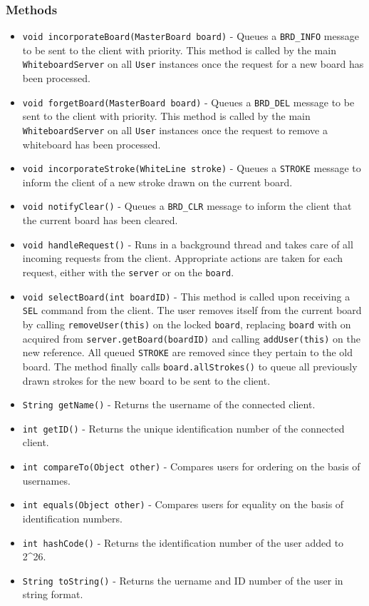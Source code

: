 \subsubsection{Methods}
\begin{itemize}
\item \texttt{void incorporateBoard(MasterBoard board)} - Queues a \texttt{BRD\_INFO} message to be sent to the client with priority. This method is called by the main \texttt{WhiteboardServer} on all \texttt{User} instances once the request for a new board has been processed.
\item \texttt{void forgetBoard(MasterBoard board)} - Queues a \texttt{BRD\_DEL} message to be sent to the client with priority. This method is called by the main \texttt{WhiteboardServer} on all \texttt{User} instances once the request to remove a whiteboard has been processed.
\item \texttt{void incorporateStroke(WhiteLine stroke)} - Queues a \texttt{STROKE} message to inform the client of a new stroke drawn on the current board.
\item \texttt{void notifyClear()} - Queues a \texttt{BRD\_CLR} message to inform the client that the current board has been cleared.
\item \texttt{void handleRequest()} - Runs in a background thread and takes care of all incoming requests from the client. Appropriate actions are taken for each request, either with the \texttt{server} or on the \texttt{board}.
\item \texttt{void selectBoard(int boardID)} - This method is called upon receiving a \texttt{SEL} command from the client. The user removes itself from the current board by calling \texttt{removeUser(this)} on the locked \texttt{board}, replacing \texttt{board} with on acquired from \texttt{server.getBoard(boardID)} and calling \texttt{addUser(this)} on the new reference. All queued \texttt{STROKE} are removed since they pertain to the old board. The method finally calls \texttt{board.allStrokes()} to queue all previously drawn strokes for the new board to be sent to the client.
\item \texttt{String getName()} - Returns the username of the connected client.
\item \texttt{int getID()} - Returns the unique identification number of the connected client.
\item \texttt{int compareTo(Object other)} - Compares users for ordering on the basis of usernames.
\item \texttt{int equals(Object other)} - Compares users for equality on the basis of identification numbers.
\item \texttt{int hashCode()} - Returns the identification number of the user added to 2^{26}.
\item \texttt{String toString()} - Returns the uername and ID number of the user in string format.
\end{itemize}


